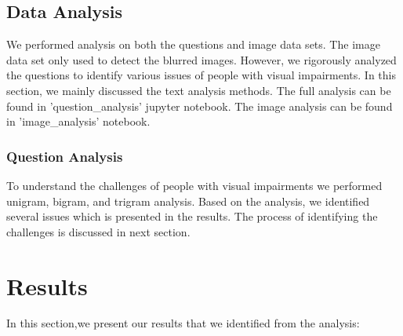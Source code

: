 \documentclass[sigconf]{acmart}
\begin{document}
\subsection{Data Analysis}
We performed analysis on both the questions and image data sets. The image data set only used to detect the blurred images. However, we rigorously analyzed the questions to identify various issues of people with visual impairments. In this section, we mainly discussed the text analysis methods. The full analysis can be found in 'question\_analysis' jupyter notebook. The image analysis can be found in 'image\_analysis' notebook. 

\subsubsection{Question Analysis}
To understand the challenges of people with visual impairments we performed unigram, bigram, and trigram analysis. Based on the analysis, we identified several issues which is presented in the results. The process of identifying the challenges is discussed in next section.

\section{Results}
In this section,we present our results that we identified from the analysis:
\end{document}
